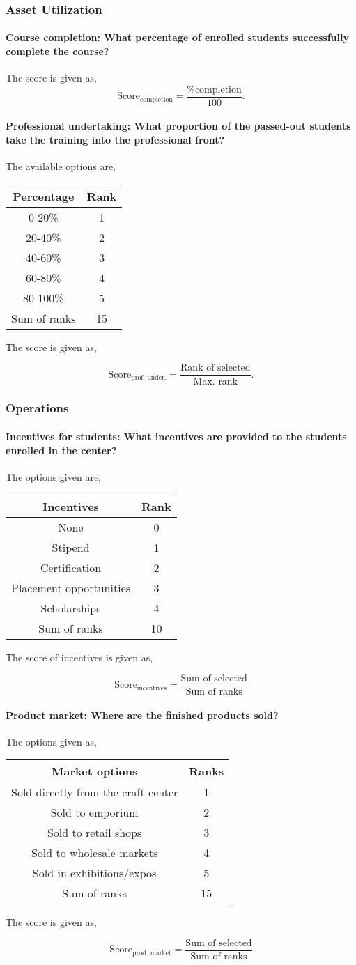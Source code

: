 \documentclass[oneside,twocolumn]{article}
\newcommand{\tsub}[2]{\text{#1}_{\text{#2}}}
\newcommand{\dsub}[2]{\dfrac{\text{#1}}{\text{#2}}}
\newcommand{\multsel}[1]
{
	\[
		\tsub{Score}{#1} = \dsub{Sum of selected}{Sum of ranks}
	\]
}
\newcommand{\singsel}[1]
{
	\[
		\tsub{Score}{#1} = \dsub{Rank of selected}{Max. rank}.
	\]
}
\newenvironment{ttable}
{
\begin{center}
\begin{tabular}{c|c}
\hline
}
{
\\ \hline
\end{tabular}
\end{center}
}
\begin{document}
\subsubsection{Asset Utilization}
\paragraph{Course completion: What percentage of enrolled students successfully complete the course?}
The score is given as,
\[
	\tsub{Score}{completion} = \dfrac{\% \text{completion}}{100}.
\]	
\paragraph{Professional undertaking: What proportion of the passed-out students take the training into the professional front?}
The available options are,
\begin{ttable}
	Percentage & Rank \\ \hline
	0-20\% & 1 \\
	20-40\% & 2 \\
	40-60\% & 3 \\
	60-80\% & 4 \\
	80-100\% & 5 \\ \hline
	Sum of ranks & 15
\end{ttable}
The score is given as,
\singsel{prof. under.}

\subsubsection{Operations}
\paragraph{Incentives for students: What incentives are provided to the students enrolled in the center?}
The options given are,
\begin{ttable}
	Incentives & Rank \\ \hline
	None & 0 \\
	Stipend & 1 \\
	Certification & 2 \\
	Placement opportunities & 3 \\
	Scholarships & 4 \\ \hline
	Sum of ranks & 10
\end{ttable}
The score of incentives is given as,
\multsel{incentives}
\paragraph{Product market: Where are the finished products sold?}
The options given as,
\begin{ttable}
	Market options & Ranks \\ \hline
	Sold directly from the craft center & 1 \\
	Sold to emporium & 2 \\
	Sold to retail shops & 3 \\
	Sold to wholesale markets & 4 \\
	Sold in exhibitions/expos & 5 \\ \hline
	Sum of ranks & 15
\end{ttable}
The score is given as,
\multsel{prod. market}
\end{document}

